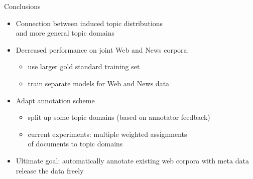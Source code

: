 \documentclass{beamer}
\begin{document}
\begin{frame}
  {Conclusions}
  \begin{itemize}
    \item Connection between induced topic distributions\\
      and more general topic domains
\pause
    \vspace{.25cm}
    \item Decreased performance on joint Web and News corpora:
    \begin{itemize}
      \item use larger gold standard training set
      \item train separate models for Web and News data
    \end{itemize}
\pause
    \vspace{.25cm}
    \item Adapt annotation scheme
    \begin{itemize}
      \item split up some topic domains (based on annotator feedback)
      \item current experiments: multiple weighted assignments\\
	of documents to topic domains
    \end{itemize}
\pause
    \vspace{.25cm}
    \item Ultimate goal: automatically annotate existing web corpora with meta data release the data freely
  \end{itemize}
\pause
\pause
\pause
\end{frame}
\end{document}
